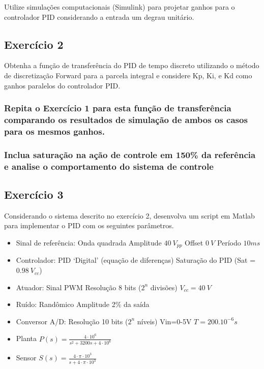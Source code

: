 Utilize simulações computacionais (Simulink\textregistered) para projetar ganhos para o controlador PID considerando a entrada um degrau unitário.

\subsection{Exercício 2}

Obtenha a função de transferência do PID de tempo discreto utilizando o método de discretização Forward para a parcela integral e considere Kp, Ki, e Kd como ganhos paralelos do controlador PID.

\subsubsection{Repita o Exercício 1 para esta função de transferência comparando os resultados de simulação de ambos os casos para os mesmos ganhos.}

\subsubsection{Inclua saturação na ação de controle em 150\% da referência e analise o comportamento do sistema de controle}

\subsection{Exercício 3}
Considerando o sistema descrito no exercício 2, desenvolva um script em Matlab para implementar o PID com os seguintes parâmetros.

\begin{itemize}
	\item Sinal de referência:
	\subitem Onda quadrada
	\subitem Amplitude $40~V_{pp}$
	\subitem Offset $0~V$
	\subitem Período $10ms$
	
	\item Controlador:
	\subitem PID ‘Digital’ (equação de diferenças)
	\subitem Saturação do PID (Sat = $0.98~V_{cc}$)
	
	\item Atuador: Sinal PWM
	\subitem Resolução 8 bits ($2^n$ divisões)
	\subitem $V_{cc}=40~V$
	
	\item Ruído:
	\subitem Randômico
	\subitem Amplitude 2\% da saída
	
	\item Conversor A/D:
	\subitem Resolução 10 bits ($2^n$ níveis)
	\subitem Vin=0-5V
	\subitem $T=200.10^{-6} s$
	
	\item Planta
	\subitem $P(s)=\frac{4 \cdot 10^{6}}{s^{2}+3200s+4 \cdot 10^{6}}$
	
	\item Sensor
	\subitem $S(s)=\frac{4 \cdot \pi \cdot 10^{3}}{s + 4 \cdot \pi \cdot 10^{3}}$
\end{itemize}


